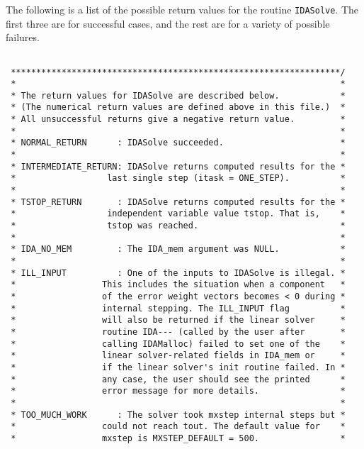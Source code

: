 \documentclass[11pt]{article}
\begin{document}
\begin{verbatim}
\end{verbatim}
\normalsize

The following is a list of the possible return values for the routine
{\tt IDASolve}.  The first three are for successful cases, and the
rest are for a variety of possible failures.

\small
\begin{verbatim}

 *****************************************************************/
 *                                                                *
 * The return values for IDASolve are described below.            *
 * (The numerical return values are defined above in this file.)  *
 * All unsuccessful returns give a negative return value.         *
 *                                                                *
 * NORMAL_RETURN      : IDASolve succeeded.                       *
 *                                                                *
 * INTERMEDIATE_RETURN: IDASolve returns computed results for the *
 *                  last single step (itask = ONE_STEP).          *
 *                                                                *
 * TSTOP_RETURN       : IDASolve returns computed results for the *
 *                  independent variable value tstop. That is,    *
 *                  tstop was reached.                            *
 *                                                                *
 * IDA_NO_MEM         : The IDA_mem argument was NULL.            *
 *                                                                *
 * ILL_INPUT          : One of the inputs to IDASolve is illegal. *
 *                 This includes the situation when a component   *
 *                 of the error weight vectors becomes < 0 during *
 *                 internal stepping. The ILL_INPUT flag          *
 *                 will also be returned if the linear solver     *
 *                 routine IDA--- (called by the user after       *
 *                 calling IDAMalloc) failed to set one of the    *
 *                 linear solver-related fields in IDA_mem or     *
 *                 if the linear solver's init routine failed. In *
 *                 any case, the user should see the printed      *
 *                 error message for more details.                *
 *                                                                *
 * TOO_MUCH_WORK      : The solver took mxstep internal steps but *
 *                 could not reach tout. The default value for    *
 *                 mxstep is MXSTEP_DEFAULT = 500.                *

\end{verbatim}
\end{document}
